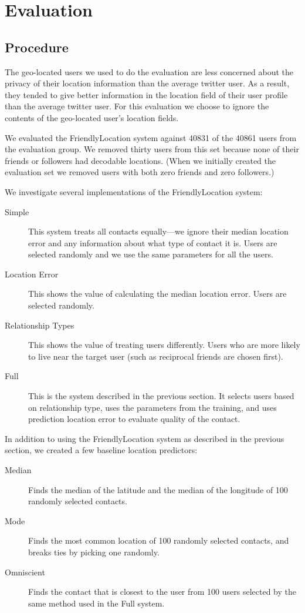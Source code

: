 \documentclass{sig-alternate}
\begin{document}
\section{Evaluation}

\subsection{Procedure}
The geo-located users we used to do the evaluation are less concerned about the
privacy of their location information than the average twitter user.
As a result, they tended to give better information in the location field of
their user profile than the average twitter user.
For this evaluation we choose to ignore the contents of the geo-located user's
location fields.

We evaluated the FriendlyLocation system against 40831 of the 40861 users from the evaluation group.
We removed thirty users from this set because none of their friends or
followers had decodable locations.
(When we initially created the evaluation
set we removed users with both zero friends and zero followers.)

We investigate several implementations of the FriendlyLocation system:
\begin{description}
\item[Simple] This system treats all contacts equally---we ignore their median location error and any information about what type of contact it is. Users are selected randomly and we use the same parameters for all the users.
\item[Location Error] This shows the value of calculating the median location error. Users are selected randomly.
\item[Relationship Types] This shows the value of treating users differently. Users who are more likely to live near the target user (such as reciprocal friends are chosen first).
\item[Full] This is the system described in the previous section. It selects users based on relationship type, uses the parameters from the training, and uses
prediction location error to evaluate quality of the contact.
\end{description}

In addition to using the FriendlyLocation system as described in the previous section, we created a few baseline location predictors:
\begin{description}
\item[Median] Finds the median of the latitude and the median of the longitude of 100 randomly selected contacts.
\item[Mode] Finds the most common location of 100 randomly selected contacts, and breaks ties by picking one randomly.
\item[Omniscient] Finds the contact that is closest to the user from 100 users selected by the same method used in the Full system.
\end{description}
\end{document}
